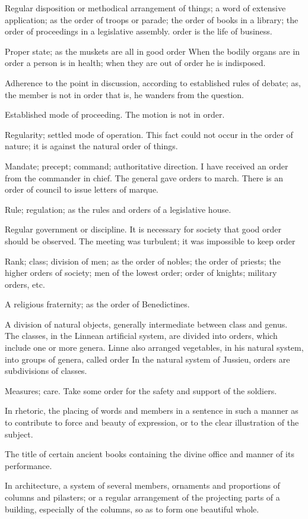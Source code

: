 		\begin{compactitem}
			\item[1] Regular disposition or methodical arrangement of things; a word of extensive application; as the order of troops or parade; the order of books in a library; the order of proceedings in a legislative assembly. order is the life of business.
			\item[2] Proper state; as the muskets are all in good order When the bodily organs are in order a person is in health; when they are out of order he is indisposed.
			\item[3] Adherence to the point in discussion, according to established rules of debate; as, the member is not in order that is, he wanders from the question.
			\item[4] Established mode of proceeding. The motion is not in order.
			\item[5] Regularity; settled mode of operation. This fact could not occur in the order of nature; it is against the natural order of things.
			\item[6] Mandate; precept; command; authoritative direction. I have received an order from the commander in chief. The general gave orders to march. There is an order of council to issue letters of marque.
			\item[7] Rule; regulation; as the rules and orders of a legislative house.
			\item[8] Regular government or discipline. It is necessary for society that good order should be observed. The meeting was turbulent; it was impossible to keep order
			\item[9] Rank; class; division of men; as the order of nobles; the order of priests; the higher orders of society; men of the lowest order; order of knights; military orders, etc.
			\item[10] A religious fraternity; as the order of Benedictines.
			\item[11] A division of natural objects, generally intermediate between class and genus. The classes, in the Linnean artificial system, are divided into orders, which include one or more genera. Linne also arranged vegetables, in his natural system, into groups of genera, called order In the natural system of Jussieu, orders are subdivisions of classes.
			\item[12] Measures; care. Take some order for the safety and support of the soldiers.
			\item[13] In rhetoric, the placing of words and members in a sentence in such a manner as to contribute to force and beauty of expression, or to the clear illustration of the subject.
			\item[14] The title of certain ancient books containing the divine office and manner of its performance.
			\item[15] In architecture, a system of several members, ornaments and proportions of columns and pilasters; or a regular arrangement of the projecting parts of a building, especially of the columns, so as to form one beautiful whole. 
		\end{compactitem}


